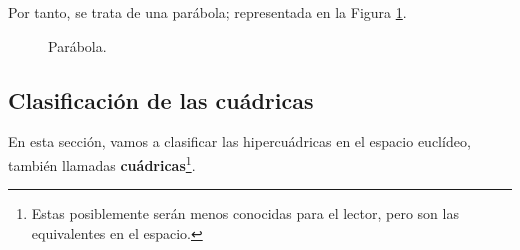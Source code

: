 \begin{enumerate}
    Por tanto, se trata de una parábola; representada en la Figura \ref{fig:Parabola}.
    \begin{figure}
        \centering
        \caption{Parábola.}
        \label{fig:Parabola}
    \end{figure}
    
\end{enumerate}



\subsection{Clasificación de las cuádricas}

En esta sección, vamos a clasificar las hipercuádricas en el espacio euclídeo, también llamadas \textbf{cuádricas}\footnote{Estas posiblemente serán menos conocidas para el lector, pero son las equivalentes en el espacio.}.

